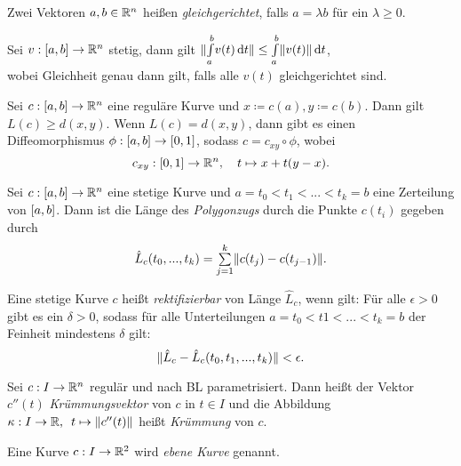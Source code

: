 \documentclass{cheat-sheet}
\newcommand{\Intabdt}[1]{\Int{a}{b}{#1}{t}}
\begin{document}
\begin{defn}
  Zwei Vektoren $a, b \in \mathbb{R}^n$ heißen \emph{gleichgerichtet}, falls $a = \lambda b$ für ein $\lambda \geq 0$.
\end{defn}

\begin{satz}
  Sei $v : \left[ a, b \right] \to \mathbb{R}^n$ stetig, dann gilt $\norm{\Intabdt{v(t)}} \leq \Intabdt{\norm{v(t)}}$,\\
  wobei Gleichheit genau dann gilt, falls alle $v(t)$ gleichgerichtet sind.
\end{satz}

\begin{satz}
  Sei $c : \left[ a, b \right] \to \mathbb{R}^n$ eine reguläre Kurve und $x \coloneqq c(a), y \coloneqq c(b)$. Dann gilt $L(c) \geq d(x, y)$. Wenn $L(c) = d(x, y)$, dann gibt es einen Diffeomorphismus $\phi : \left[ a, b \right] \to \left[ 0, 1 \right]$, sodass $c = c_{xy} \circ \phi$, wobei
  \[ c_{xy} : \left[ 0, 1 \right] \to \mathbb{R}^n, \quad t \mapsto x + t (y - x). \]
\end{satz}


\begin{defn}
  Sei $c : \left[ a, b \right] \to \mathbb{R}^n$ eine stetige Kurve und $a = t_0 < t_1 < ... < t_k = b$ eine Zerteilung von $\left[ a, b \right]$. Dann ist die Länge des \emph{Polygonzugs} durch die Punkte $c(t_i)$ gegeben durch
  \[ \hat{L}_c(t_0, ..., t_k) = \sum_{j=1}^k \norm{c(t_j) - c(t_{j-1})}. \]
\end{defn}

\begin{defn}
  Eine stetige Kurve $c$ heißt \emph{rektifizierbar} von Länge $\hat{L}_c$, wenn gilt: Für alle $\epsilon > 0$ gibt es ein $\delta > 0$, sodass für alle Unterteilungen $a = t_0 < t1 < ... < t_k = b$ der Feinheit mindestens $\delta$ gilt:
  \[ \lVert\hat{L}_c - \hat{L}_c(t_0, t_1, ..., t_k)\rVert < \epsilon. \]
\end{defn}


\begin{defn}
  Sei $c : I \to \mathbb{R}^n$ regulär und nach BL parametrisiert. Dann heißt der Vektor $c''(t)$ \emph{Krümmungsvektor} von $c$ in $t \in I$ und die Abbildung $\kappa : I \to \mathbb{R}, \enspace t \mapsto \lVert c''(t)\rVert$ heißt \emph{Krümmung} von $c$. %
\end{defn}

\begin{defn}
  Eine Kurve $c : I \to \mathbb{R}^2$ wird \emph{ebene Kurve} genannt.
\end{defn}
\end{document}
